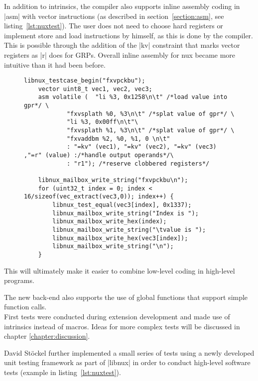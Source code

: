 In addition to intrinsics, the compiler also supports inline assembly coding in |asm| with vector instructions (as described in section~\ref{section:asm}, see listing~\ref{lst:nuxtest}).
The user does not need to choose hard registers or implement store and load instructions by himself, as this is done by the compiler.
This is possible through the addition of the |kv| constraint that marks vector registers as |r| does for GRPs.
Overall inline assembly for nux became more intuitive than it had been before.
\begin{figure}[htb]
{
\begin{lstlisting}[caption={Example of nux Test.\hspace{\textwidth} This This test directly loads two values as immediates into registers and splats them into vector registers. Those vector registers are added and the result saved in a variable. The result is then tested and also written into the mailbox for analysis.}, label=lst:nuxtest]
	libnux_testcase_begin("fxvpckbu");
	vector uint8_t vec1, vec2, vec3;
	asm volatile (	"li %3, 0x1258\n\t" /*load value into gpr*/ \
			"fxvsplath %0, %3\n\t" /*splat value of gpr*/ \
			"li %3, 0x00ff\n\t"\
			"fxvsplath %1, %3\n\t" /*splat value of gpr*/ \
			"fxvaddbm %2, %0, %1, 0 \n\t"
			: "=kv" (vec1), "=kv" (vec2), "=kv" (vec3) ,"=r" (value) :/*handle output operands*/\
			: "r1"); /*reserve clobbered registers*/

	libnux_mailbox_write_string("fxvpckbu\n");
	for (uint32_t index = 0; index < 16/sizeof(vec_extract(vec3,0)); index++) {
		libnux_test_equal(vec3[index], 0x1337);
		libnux_mailbox_write_string("Index is ");
		libnux_mailbox_write_hex(index);
		libnux_mailbox_write_string("\tvalue is ");
		libnux_mailbox_write_hex(vec3[index]);
		libnux_mailbox_write_string("\n");
	}
\end{lstlisting}
}
\end{figure}

This will ultimately make it easier to combine low-level coding in high-level programs.

The new back-end also supports the use of global functions that support simple function calls.
\\
First tests were conducted during extension development and made use of intrinsics instead of macros.
Ideas for more complex tests will be discussed in chapter \ref{chapter:discussion}.

David Stöckel further implemented a small series of tests using a newly developed unit testing framework as part of |libnux| in order to conduct high-level software tests (example in listing~\ref{lst:nuxtest}).

